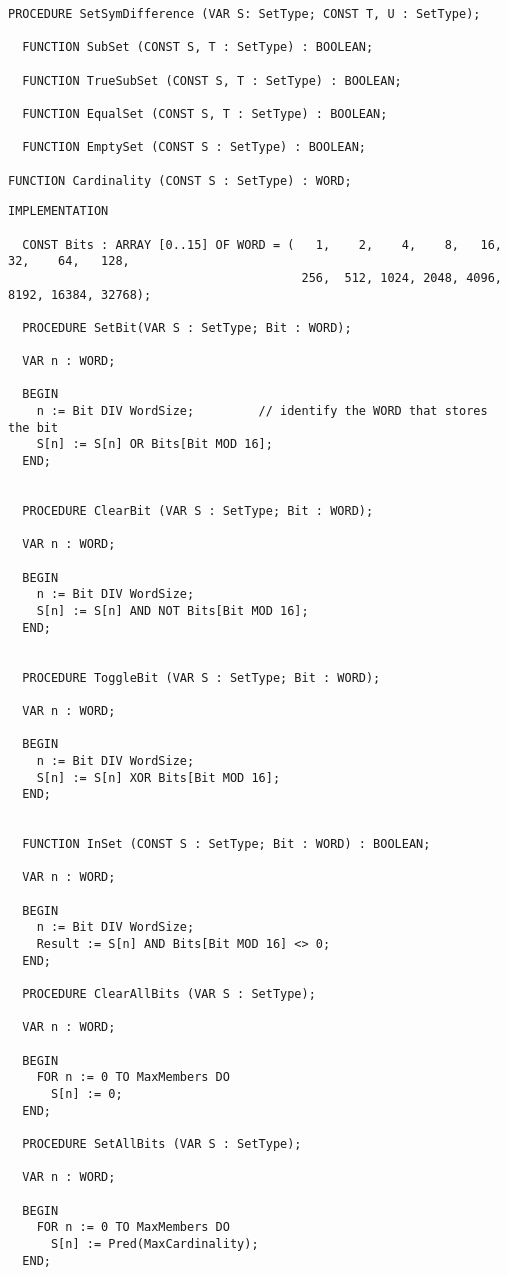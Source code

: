 \begin{refsection}
\begin{lstlisting}[caption=Interface]
  PROCEDURE SetSymDifference (VAR S: SetType; CONST T, U : SetType);

  FUNCTION SubSet (CONST S, T : SetType) : BOOLEAN;

  FUNCTION TrueSubSet (CONST S, T : SetType) : BOOLEAN;

  FUNCTION EqualSet (CONST S, T : SetType) : BOOLEAN;

  FUNCTION EmptySet (CONST S : SetType) : BOOLEAN;

FUNCTION Cardinality (CONST S : SetType) : WORD;
\end{lstlisting}

\begin{lstlisting}[caption=Implementation]
  IMPLEMENTATION

  CONST Bits : ARRAY [0..15] OF WORD = (   1,    2,    4,    8,   16,   32,    64,   128,
                                         256,  512, 1024, 2048, 4096, 8192, 16384, 32768);

  PROCEDURE SetBit(VAR S : SetType; Bit : WORD);

  VAR n : WORD;

  BEGIN
    n := Bit DIV WordSize;         // identify the WORD that stores the bit
    S[n] := S[n] OR Bits[Bit MOD 16];
  END;


  PROCEDURE ClearBit (VAR S : SetType; Bit : WORD);

  VAR n : WORD;

  BEGIN
    n := Bit DIV WordSize;
    S[n] := S[n] AND NOT Bits[Bit MOD 16];
  END;


  PROCEDURE ToggleBit (VAR S : SetType; Bit : WORD);

  VAR n : WORD;

  BEGIN
    n := Bit DIV WordSize;
    S[n] := S[n] XOR Bits[Bit MOD 16];
  END;


  FUNCTION InSet (CONST S : SetType; Bit : WORD) : BOOLEAN;

  VAR n : WORD;

  BEGIN
    n := Bit DIV WordSize;
    Result := S[n] AND Bits[Bit MOD 16] <> 0;
  END;

  PROCEDURE ClearAllBits (VAR S : SetType);

  VAR n : WORD;

  BEGIN
    FOR n := 0 TO MaxMembers DO
      S[n] := 0;
  END;

  PROCEDURE SetAllBits (VAR S : SetType);

  VAR n : WORD;

  BEGIN
    FOR n := 0 TO MaxMembers DO
      S[n] := Pred(MaxCardinality);
  END;


\end{lstlisting}
\end{refsection}
